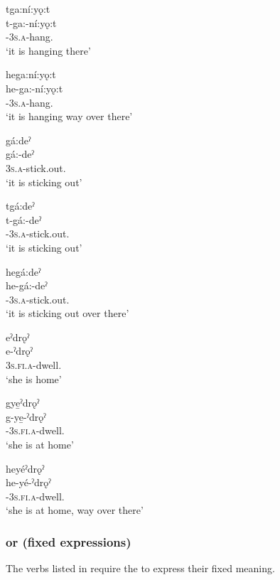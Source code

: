 \newpage
\ea tga:ní:yǫ:t\\
\gll t-ga:-ní:yǫ:t\\
{\cislocative}-\textsc{3s.a}-hang.{\stative}\\
\glt `it is hanging there'

\ex hega:ní:yǫ:t\\
\gll he-ga:-ní:yǫ:t\\
{\translocative}-\textsc{3s.a}-hang.{\stative}\\
\glt `it is hanging way over there'
\z

\ex gá:deˀ\\
\gll gá:-deˀ\\
\textsc{3s.a}-stick.out.{\stative}\\
\glt `it is sticking out'

\ea tgá:deˀ\\
\gll t-gá:-deˀ\\
{\cislocative}-\textsc{3s.a}-stick.out.{\stative}\\
\glt `it is sticking out'

\ex hegá:deˀ\\
\gll he-gá:-deˀ\\
{\translocative}-\textsc{3s.a}-stick.out.{\stative}\\
\glt `it is sticking out over there'
\z

\ex eˀdrǫˀ\\
\gll e-ˀdrǫˀ\\
\textsc{3s.fi.a}-dwell.{\stative}\\
\glt `she is home'

\ea gye̱ˀdrǫˀ\\
\gll g-ye̱-ˀdrǫˀ\\
{\cislocative}-\textsc{3s.fi.a}-dwell.{\stative}\\
\glt `she is at home'

\ex heyéˀdrǫˀ\\
\gll he-yé-ˀdrǫˀ\\
{\translocative}-\textsc{3s.fi.a}-dwell.{\stative}\\
\glt `she is at home, way over there'
\z
\z
\z 


\subsubsection*{ or  (fixed expressions)} \label{[d-verb] or [heˀ-verb] (fixed expressions)}
The verbs listed in  require the  {\cislocative} to express their fixed meaning.

